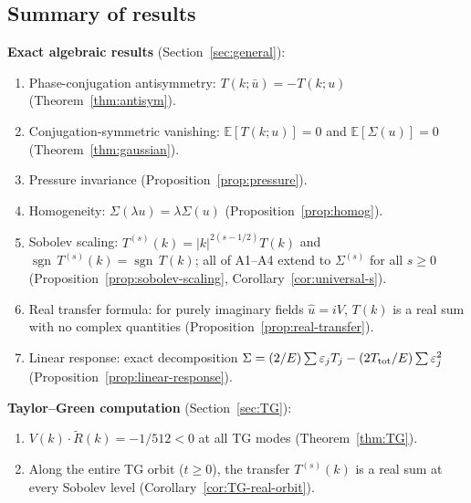 \documentclass[11pt]{article}
\theoremstyle{definition}
\newcommand{\E}{\mathbb{E}}
\DeclareMathOperator{\sgn}{sgn}
\begin{document}
\subsection{Summary of results}

\noindent\textbf{Exact algebraic results}
(Section~\ref{sec:general}):
\begin{enumerate}[leftmargin=2em,label=(A\arabic*)]
\item Phase-conjugation antisymmetry:
  $T(k;\bar u) = -T(k;u)$
  (Theorem~\ref{thm:antisym}).
\item Conjugation-symmetric vanishing: $\E[T(k;u)] = 0$
  and $\E[\Sigma(u)]=0$
  (Theorem~\ref{thm:gaussian}).
\item Pressure invariance
  (Proposition~\ref{prop:pressure}).
\item Homogeneity: $\Sigma(\lambda u)=\lambda\Sigma(u)$
  (Proposition~\ref{prop:homog}).
\item Sobolev scaling:
  $T^{(s)}(k)=|k|^{2(s-1/2)}T(k)$ and
  $\sgn\,T^{(s)}(k)=\sgn\,T(k)$; all of
  A1--A4 extend to $\Sigma^{(s)}$ for all
  $s\geq 0$
  (Proposition~\ref{prop:sobolev-scaling},
  Corollary~\ref{cor:universal-s}).
\item Real transfer formula: for purely imaginary
  fields $\hat u=iV$, $T(k)$ is a real sum with
  no complex quantities
  (Proposition~\ref{prop:real-transfer}).
\item Linear response: exact decomposition
  $\Sigma = (2/E)\sum\varepsilon_j T_j
  - (2T_{\rm tot}/E)\sum\varepsilon_j^2$
  (Proposition~\ref{prop:linear-response}).
\end{enumerate}

\noindent\textbf{Taylor--Green computation}
(Section~\ref{sec:TG}):
\begin{enumerate}[leftmargin=2em,label=(B\arabic*)]
\item $V(k)\cdot\widetilde R(k)=-1/512 < 0$ at all
  TG modes (Theorem~\ref{thm:TG}).
\item Along the entire TG orbit ($t\geq 0$), the
  transfer $T^{(s)}(k)$ is a real sum at every
  Sobolev level
  (Corollary~\ref{cor:TG-real-orbit}).
\end{enumerate}
\end{document}
